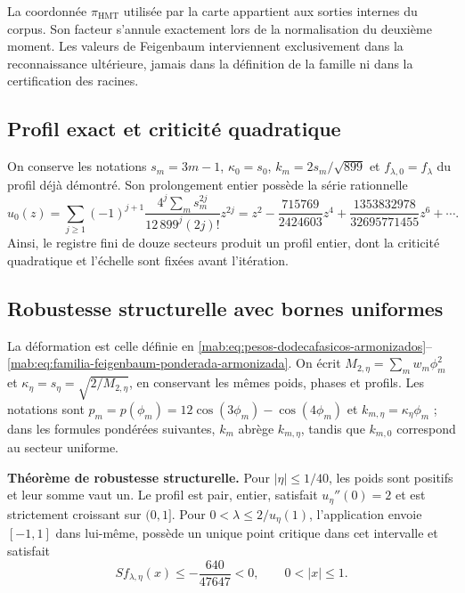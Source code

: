 La coordonnée \(\pi_{\mathrm{HMT}}\) utilisée par la carte appartient aux sorties internes du corpus. Son facteur s’annule exactement lors de la normalisation du deuxième moment. Les valeurs de Feigenbaum interviennent exclusivement dans la reconnaissance ultérieure, jamais dans la définition de la famille ni dans la certification des racines.


\subsection{Profil exact et criticité quadratique}
\label{hmtfg:desarrollo:2}

On conserve les notations $s_m=3m-1$, $\kappa_0=s_0$, $k_m=2s_m/\sqrt{899}$ et $f_{\lambda,0}=f_\lambda$ du profil déjà démontré. Son prolongement entier possède la série rationnelle
\[
u_0(z)=\sum_{j\ge1}(-1)^{j+1}
\frac{4^j\sum_m s_m^{2j}}{12\,899^j(2j)!}z^{2j}
=z^2-\frac{715769}{2424603}z^4
+\frac{1353832978}{32695771455}z^6+\cdots.
\]
Ainsi, le registre fini de douze secteurs produit un profil entier, dont la criticité quadratique et l’échelle sont fixées avant l’itération.


\subsection{Robustesse structurelle avec bornes uniformes}
\label{hmtfg:desarrollo:3}

La déformation est celle définie en \eqref{mab:eq:pesos-dodecafasicos-armonizados}--\eqref{mab:eq:familia-feigenbaum-ponderada-armonizada}. On écrit $M_{2,\eta}=\sum_mw_m\phi_m^2$ et $\kappa_\eta=s_\eta=\sqrt{2/M_{2,\eta}}$, en conservant les mêmes poids, phases et profils.
Les notations sont $p_m=p(\phi_m)=12\cos(3\phi_m)-\cos(4\phi_m)$ et $k_{m,\eta}=\kappa_\eta\phi_m$ ; dans les formules pondérées suivantes, $k_m$ abrège $k_{m,\eta}$, tandis que $k_{m,0}$ correspond au secteur uniforme.

\textbf{Théorème de robustesse structurelle.} Pour \(|\eta|\le1/40\), les poids sont positifs et leur somme vaut un. Le profil est pair, entier, satisfait \(u_\eta''(0)=2\) et est strictement croissant sur \((0,1]\). Pour \(0<\lambda\le2/u_\eta(1)\), l’application envoie \([-1,1]\) dans lui-même, possède un unique point critique dans cet intervalle et satisfait
\[
S f_{\lambda,\eta}(x)\le-\frac{640}{47647}<0,\qquad0<|x|\le1.
\]

